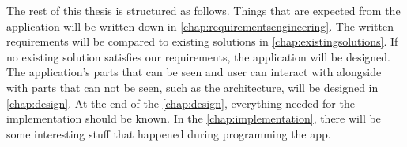 The rest of this thesis is structured as follows.
Things that are expected from the application will be written down in \autoref{chap:requirementsengineering}.
The written requirements will be compared to existing solutions in \autoref{chap:existingsolutions}.
If no existing solution satisfies our requirements, the application will be designed. 
The application's parts that can be seen and user can interact with alongside with parts that can not be seen, such as the architecture, will be designed in \autoref{chap:design}.
At the end of the \autoref{chap:design}, everything needed for the implementation should be known.
In the \autoref{chap:implementation}, there will be some interesting stuff that happened during programming the app.  